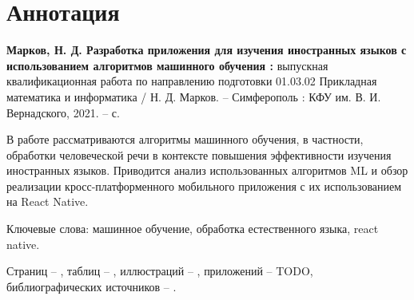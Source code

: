 \section*{Аннотация}
\textbf{Марков, Н. Д. Разработка приложения для изучения иностранных языков с использованием алгоритмов машинного обучения :} выпускная квалификационная работа по направлению подготовки 01.03.02 Прикладная математика и информатика / Н. Д. Марков. -- Симферополь : КФУ им. В. И. Вернадского, 2021. -- \pageref{LastPage}с.

В работе рассматриваются алгоритмы машинного обучения, в частности, обработки человеческой речи в контексте повышения эффективности изучения иностранных языков. Приводится анализ использованных алгоритмов ML и обзор реализации кросс-платформенного мобильного приложения с их использованием на React Native.

Ключевые слова: машинное обучение, обработка естественного языка, react native.

Страниц -- \pageref{LastPage}, таблиц -- \totaltables{}, иллюстраций -- \totalfigures{}, приложений -- {\color{red}TODO}, библиографических источников -- .
